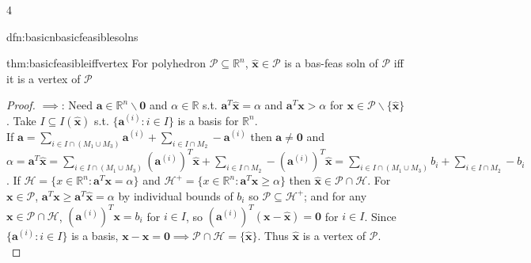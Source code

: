 \documentclass[landscape, 8pt]{extarticle}
\begin{document}
\begin{multicols*}{4}
\begin{mdfn}{dfn:basicnbasicfeasiblesolns}{ }
		\end{mdfn}
		
		
		\begin{thm}{thm:basicfeasibleiffvertex}{ }
			For polyhedron $\mathcal{P} \subseteq\mathbb{R}^n$, $\mathbf{\hat{x}}\in \mathcal{P}$ is a bas-feas soln of $\mathcal{P}$ iff it is a vertex of $\mathcal{P}$
			\vspace{-7pt}
			\begin{proof}
				$\implies$: Need $\mathbf{a}\in \mathbb{R}^n\backslash \mathbf{0}$ and $\alpha\in \mathbb{R}$ s.t. $\mathbf{a}^T\mathbf{\hat{x}} = \alpha$ and $\mathbf{a}^T\mathbf{x} > \alpha$ for $\mathbf{x}\in \mathcal{P}\backslash\{\mathbf{\hat{x}}\}$. Take $I \subseteq I(\mathbf{\hat{x}})$ s.t. $\{\mathbf{a}^{(i)} : i\in I\}$ is a basis for $\mathbb{R}^n$. \\
				If $\mathbf{a} = \sum_{i\in I \cap (M_1 \cup M_3)} \mathbf{a}^{(i)}  + \sum_{i\in I \cap M_2}-\mathbf{a}^{(i)}$ then $\mathbf{a} \ne \mathbf{0}$ and \\
				$\alpha = \mathbf{a}^T\mathbf{\hat{x}} =  \sum_{i\in I \cap (M_1 \cup M_3)} (\mathbf{a}^{(i)})^T\mathbf{\hat{x}}  + \sum_{i\in I \cap M_2}-(\mathbf{a}^{(i)})^T\mathbf{\hat{x}} =  \sum_{i\in I \cap (M_1 \cup M_3)} b_i  + \sum_{i\in I \cap M_2}-b_i$. If $\mathcal{H} = \{x\in \mathbb{R}^n: \mathbf{a}^T\mathbf{x} = \alpha\}$ and $\mathcal{H}^+ = \{x\in \mathbb{R}^n : \mathbf{a}^T \mathbf{x} \ge \alpha\}$ then $\mathbf{\hat{x}}\in \mathcal{P} \cap \mathcal{H}$. For $\mathbf{x}\in \mathcal{P}$, $\mathbf{a}^T \mathbf{x} \ge \mathbf{a}^T\mathbf{\hat{x}} = \alpha$ by individual bounds of $b_i$ so $\mathcal{P} \subseteq \mathcal{H}^+$; and for any $\mathbf{x}\in \mathcal{P} \cap \mathcal{H}$, $(\mathbf{a}^{(i)})^T\mathbf{x} = b_i$ for $i\in I$, so $(\mathbf{a}^{(i)})^T(\mathbf{x} - \mathbf{\hat{x}}) = \mathbf{0}$ for $ i\in I$. Since $\{\mathbf{a}^{(i)} : i\in I\}$ is a basis, $\mathbf{x} - \mathbf{\hat{x}} = \mathbf{0} \implies \mathcal{P} \cap \mathcal{H} = \{\mathbf{\hat{x}}\}$. Thus $\mathbf{\hat{x}}$ is a vertex of $\mathcal{P}$.\\

\end{proof}
\end{thm}
\end{multicols*}
\end{document}
